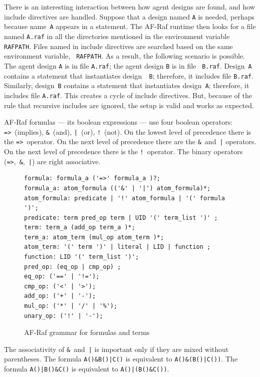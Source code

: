 \documentclass[a4paper,12pt,oneside,fleqn]{book} %
\begin{document}
There is an interesting interaction between how agent designs are found,
and how include directives are handled. Suppose that a design named {\tt A}
is needed, perhaps because name~{\tt A} appears in a statement. The AF-Raf
runtime then looks for a file named {\tt A.raf} in all the directories
mentioned in the environment variable {\tt RAFPATH}. Files named in include
directives are searched based on the same environment variable, {\tt
RAFPATH}. As a result, the following scenario is possible. The agent design
{\tt A} is in file {\tt A.raf}; the agent design {\tt B} is in file {\tt
B.raf}. Design~{\tt A} contains a statement that instantiates design~{\tt
B}; therefore, it includes file {\tt B.raf}. Similarly, design~{\tt B}
contains a statement that instantiates design~{\tt A}; therefore, it
includes file {\tt A.raf}. This creates a cycle of include directives.
But, because of the rule that recursive includes are ignored, the setup is
valid and works as expected.

AF-Raf formulas --- its boolean expressions --- use four boolean operators:
\verb+=>+~(implies), \verb+&+~(and), \verb+|+~(or), \verb+!+~(not).  On the
lowest level of precedence there is the \verb+=>+~operator.  On the next
level of precedence there are the \verb+&+~and~\verb+|+ operators. On the
next level of precedence there is the \verb+!+~operator.  The binary
operators (\verb+=>+,~\verb+&+,~\verb+|+) are right associative.

\begin{figure}\footnotesize %
\begin{verbatim}
formula: formula_a ('=>' formula_a )?;
formula_a: atom_formula (('&' | '|') atom_formula)*;
atom_formula: predicate | '!' atom_formula | '(' formula ')';
predicate: term pred_op term | UID '(' term_list ')' ;
term: term_a (add_op term_a )*;
term_a: atom_term (mul_op atom_term )*;
atom_term: '(' term ')' | literal | LID | function ;
function: LID '(' term_list ')';
pred_op: (eq_op | cmp_op) ;
eq_op: ('==' | '!=');
cmp_op: ('<' | '>');
add_op: ('+' | '-');
mul_op: ('*' | '/' | '%');
unary_op: ('!' | '-');
\end{verbatim}
\caption{AF-Raf grammar for formulas and terms}
\label{fig:grammar-expr}
\end{figure} %

\begin{example}
The associativity of \verb+&+~and~\verb+|+ is important only if they are
mixed without parentheses.  The formula \verb+A()&B()|C()+ is equivalent to
\verb+A()&(B()|C())+.  The formula \verb+A()|B()&C()+ is equivalent to
\verb+A()|(B()&C())+.
\end{example}
\end{document}
